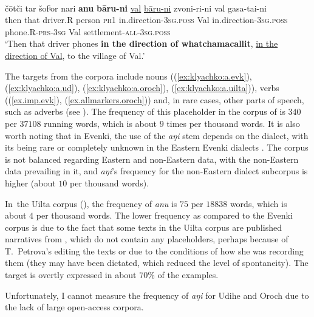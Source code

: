 \documentclass[output=paper,colorlinks,citecolor=brown
\ChapterDOI{10.5281/zenodo.15697577}
]{langscibook}
\begin{document}
\ea
\label{ex:klyachko:a.uilta}
\\
 \gll čōtči tar šofʲor nari \textbf{anu} \textbf{bāru-ni} \uline{val} \uline{bāru-ni} zvoni-ri-ni val gasa-tai-ni\\
then that driver.R person \textsc{ph1} in.direction-\textsc{3sg.poss} Val in.direction-\textsc{3sg.poss} phone.R-\textsc{prs}-\textsc{3sg} Val settlement-\textsc{all}-\textsc{3sg.poss}\\
 \glt ‘Then that driver phones \textbf{in the direction of whatchamacallit}, \uline{in the direction of Val}, to the village of Val.’
\z
{}

The targets from the corpora include nouns ((\ref{ex:klyachko:a.evk}), (\ref{ex:klyachko:a.ud}), (\ref{ex:klyachko:a.oroch}), (\ref{ex:klyachko:a.uilta})), verbs ((\ref{ex.imp.evk}), (\ref{ex.allmarkers.oroch})) and, in rare cases, other parts of speech, such as adverbs (see \citealt{klyachko2022}). The frequency of this placeholder in the corpus of \citep{EvenkiCorpusSiberianLang} is $340$ per $37 108$ running words, which is about $9$ times per thousand words. It is also worth noting that in Evenki, the use of the \textit{aŋi} stem depends on the dialect, with its being rare or completely unknown in the Eastern Evenki dialects \citep{klyachko2022}. The corpus is not balanced regarding Eastern and non-Eastern data, with the non-Eastern data prevailing in it, and \textit{aŋi}'s frequency for the non-Eastern dialect subcorpus is higher (about $10$ per thousand words).
 
In~the Uilta corpus (\cite{uiltacorpus}), the frequency of \textit{anu} is $75$ per $18 838$ words, which is about $4$ per thousand words. The lower frequency as compared to the Evenki corpus is due to the fact that some texts in the Uilta corpus are published narratives from \citet{petrova1967}, which do not contain any placeholders, perhaps because of T.~Petrova's editing the texts or due to the conditions of how she was recording them (they may have been dictated, which reduced the level of spontaneity). The target is overtly expressed in about $70\%$ of the examples.
 
Unfortunately, I cannot measure the frequency of \textit{aŋi} for Udihe and Oroch due to the lack of large open-access corpora.
\end{document}
